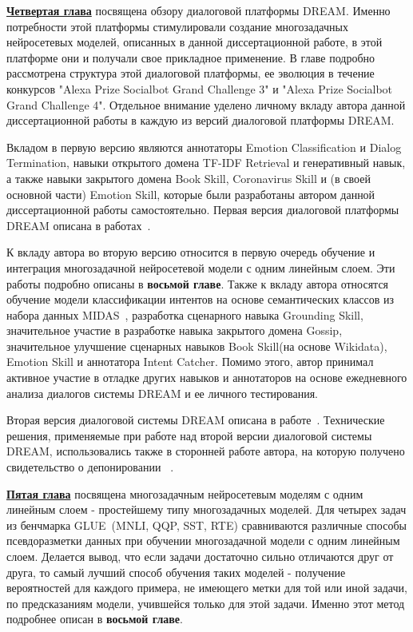 \underline{\textbf{Четвертая глава}} посвящена обзору диалоговой платформы DREAM. Именно потребности этой платформы стимулировали создание многозадачных нейросетевых моделей, описанных в данной диссертационной работе, в этой платформе они и получали свое прикладное применение. В главе подробно рассмотрена структура этой диалоговой платформы, ее эволюция в течение конкурсов "Alexa Prize Socialbot Grand Challenge 3" и "Alexa Prize Socialbot Grand Challenge 4". Отдельное внимание уделено личному вкладу автора данной диссертационной работы в каждую из версий диалоговой платформы DREAM. 

Вкладом в первую версию являются аннотаторы Emotion Classification и Dialog Termination, навыки открытого домена TF-IDF Retrieval и генеративный навык, а также навыки закрытого домена Book Skill, Coronavirus Skill и (в своей основной части) Emotion Skill, которые были разработаны автором данной диссертационной работы самостоятельно. Первая версия диалоговой платформы DREAM описана в работах~\cite{dream1,dream1_trudy}.

К вкладу автора во вторую версию относится в первую очередь обучение и интеграция многозадачной нейросетевой модели с одним линейным слоем. Эти работы подробно описаны в \textbf{восьмой главе}.  Также к вкладу автора относятся обучение модели классификации интентов на основе семантических классов из набора данных MIDAS~\cite{midas}, разработка сценарного навыка Grounding Skill, значительное участие в разработке навыка закрытого домена Gossip, значительное улучшение сценарных навыков Book Skill(на основе Wikidata), Emotion Skill и аннотатора Intent Catcher. Помимо этого, автор принимал активное участие в отладке других навыков и аннотаторов на основе ежедневного анализа диалогов системы DREAM и ее личного тестирования. 

Вторая версия диалоговой системы DREAM описана в работе~\cite{dream2}. Технические решения, применяемые при работе над второй версии диалоговой системы DREAM, использовались также в сторонней работе автора, на которую получено свидетельство о депонировании ~\cite{Дуплякин_Дмитрий_Ондар_Ушаков_2021}. 


\underline{\textbf{Пятая глава}} посвящена многозадачным нейросетевым моделям с одним линейным слоем - простейшему типу многозадачных моделей. Для четырех задач из бенчмарка GLUE~\cite{wang_2018}(MNLI, QQP, SST, RTE) сравниваются различные способы псевдоразметки данных при обучении многозадачной модели с одним линейным слоем. Делается вывод, что если задачи достаточно сильно отличаются друг от друга, то самый лучший способ обучения таких моделей - получение вероятностей для каждого примера, не имеющего метки для той или иной задачи, по предсказаниям модели, учившейся только для этой задачи. Именно этот метод подробнее описан в \textbf{восьмой главе}.

